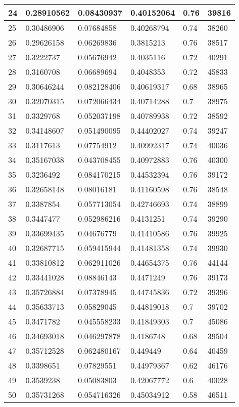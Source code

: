 \begin{longtable}{|l|l|l|l|l|l|}
24 & 0.28910562 & 0.08430937 & 0.40152064 & 0.76 & 39816 \\ \hline 
25 & 0.30486906 & 0.07684858 & 0.40268794 & 0.74 & 38260 \\ \hline 
26 & 0.29626158 & 0.06269836 & 0.3815213 & 0.76 & 38517 \\ \hline 
27 & 0.3222737 & 0.05676942 & 0.4035116 & 0.72 & 40291 \\ \hline 
28 & 0.3160708 & 0.06689694 & 0.4048353 & 0.72 & 45833 \\ \hline 
29 & 0.30646244 & 0.082128406 & 0.40619317 & 0.68 & 38965 \\ \hline 
30 & 0.32070315 & 0.072066434 & 0.40714288 & 0.7 & 38975 \\ \hline 
31 & 0.3329768 & 0.052037198 & 0.40789938 & 0.72 & 38592 \\ \hline 
32 & 0.34148607 & 0.051490095 & 0.44402027 & 0.74 & 39247 \\ \hline 
33 & 0.3117613 & 0.07754912 & 0.40992317 & 0.74 & 40036 \\ \hline 
34 & 0.35167038 & 0.043708455 & 0.40972883 & 0.76 & 40300 \\ \hline 
35 & 0.3236492 & 0.084170215 & 0.44532394 & 0.76 & 39172 \\ \hline 
36 & 0.32658148 & 0.08016181 & 0.41160598 & 0.76 & 38548 \\ \hline 
37 & 0.3387854 & 0.057713054 & 0.42746693 & 0.74 & 38899 \\ \hline 
38 & 0.3447477 & 0.052986216 & 0.4131251 & 0.74 & 39290 \\ \hline 
39 & 0.33699435 & 0.04676779 & 0.41410586 & 0.76 & 39925 \\ \hline 
40 & 0.32687715 & 0.059415944 & 0.41481358 & 0.74 & 39930 \\ \hline 
41 & 0.33810812 & 0.062911026 & 0.44654375 & 0.76 & 44144 \\ \hline 
42 & 0.33441028 & 0.08846143 & 0.4471249 & 0.76 & 39173 \\ \hline 
43 & 0.35726884 & 0.07378945 & 0.44745836 & 0.72 & 39396 \\ \hline 
44 & 0.35633713 & 0.05829045 & 0.44819018 & 0.7 & 39702 \\ \hline 
45 & 0.3471782 & 0.045558233 & 0.41849303 & 0.7 & 45086 \\ \hline 
46 & 0.34693018 & 0.046297878 & 0.4186748 & 0.68 & 39504 \\ \hline 
47 & 0.35712528 & 0.062480167 & 0.449449 & 0.64 & 40459 \\ \hline 
48 & 0.3398651 & 0.07829551 & 0.44979367 & 0.62 & 46176 \\ \hline 
49 & 0.3539238 & 0.05083803 & 0.42067772 & 0.6 & 40028 \\ \hline 
50 & 0.35731268 & 0.054716326 & 0.45034912 & 0.58 & 46511 \\ \hline 
\end{longtable}